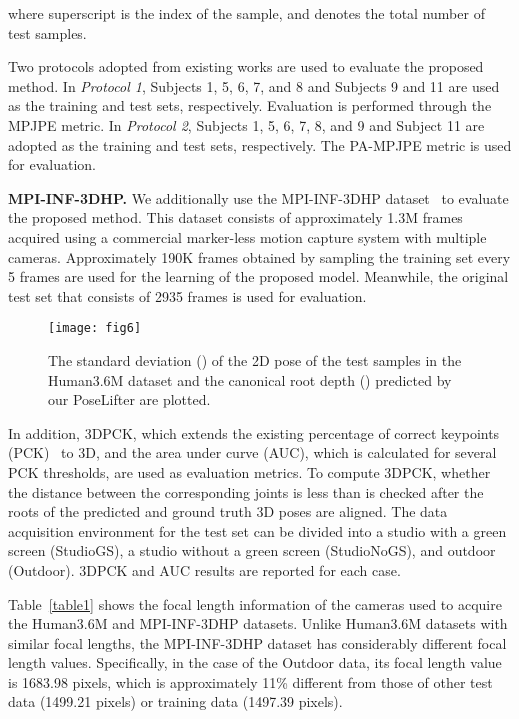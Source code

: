 \documentclass[10pt,twocolumn,letterpaper]{article}
\begin{document}
where superscript  is the index of the sample, and  denotes the total number of test samples.

Two protocols adopted from existing works are used to evaluate the proposed method. In \textit{Protocol 1}, Subjects 1, 5, 6, 7, and 8 and Subjects 9 and 11 are used as the training and test sets, respectively. Evaluation is performed through the MPJPE metric. In \textit{Protocol 2}, Subjects 1, 5, 6, 7, 8, and 9 and Subject 11 are adopted as the training and test sets, respectively. The PA-MPJPE metric is used for evaluation.

\textbf{MPI-INF-3DHP.} We additionally use the MPI-INF-3DHP dataset~\cite{Mehta2017} to evaluate the proposed method. This dataset consists of approximately 1.3M frames acquired using a commercial marker-less motion capture system with multiple cameras. Approximately 190K frames obtained by sampling the training set every 5 frames are used for the learning of the proposed model. Meanwhile, the original test set that consists of 2935 frames is used for evaluation.

\begin{figure}
\centering
\texttt{[image: fig6]}
\caption{The standard deviation () of the 2D pose of the test samples in the Human3.6M dataset and the canonical root depth () predicted by our PoseLifter are plotted.}
\label{fig6}
\end{figure}

In addition, 3DPCK, which extends the existing percentage of correct keypoints (PCK)~\cite{Tompson2014,Toshev2014} to 3D, and the area under curve (AUC), which is calculated for several PCK thresholds, are used as evaluation metrics. To compute 3DPCK, whether the distance between the corresponding joints is less than  is checked after the roots of the predicted and ground truth 3D poses are aligned. The data acquisition environment for the test set can be divided into a studio with a green screen (StudioGS), a studio without a green screen (StudioNoGS), and outdoor (Outdoor). 3DPCK and AUC results are reported for each case.

Table~\ref{table1} shows the focal length information of the cameras used to acquire the Human3.6M and MPI-INF-3DHP datasets. Unlike Human3.6M datasets with similar focal lengths, the MPI-INF-3DHP dataset has considerably different focal length values. Specifically, in the case of the Outdoor data, its focal length value is 1683.98 pixels, which is approximately 11\% different from those of other test data (1499.21 pixels) or training data (1497.39 pixels).
\end{document}
